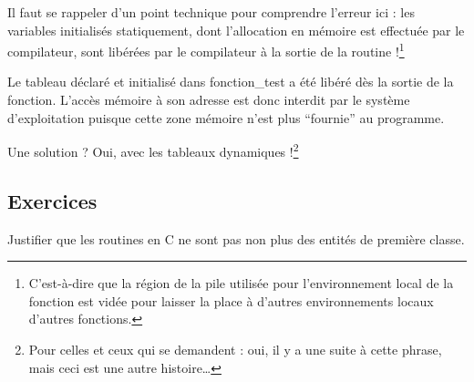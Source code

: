 \documentclass[../../../main.tex]{subfiles}
\begin{document}
Il faut se rappeler d'un point technique pour comprendre l'erreur ici : les variables initialisés statiquement, dont l'allocation en mémoire est effectuée par le compilateur, sont libérées par le compilateur à la sortie de la routine !\footnote{C'est-à-dire que la région de la pile utilisée pour l'environnement local de la fonction est vidée pour laisser la place à d'autres environnements locaux d'autres fonctions.}
 
Le tableau déclaré et initialisé dans \textsf{fonction\_test} a été libéré dès la sortie de la fonction. L'accès mémoire à son adresse est donc interdit par le système d'exploitation puisque cette zone mémoire n'est plus ``fournie'' au programme.
 
Une solution ? Oui, avec les tableaux dynamiques !\footnote{Pour celles et ceux qui se demandent : oui, il y a une suite à cette phrase, mais ceci est une autre histoire\dots}
\subsection{Exercices}
 Justifier que les routines en C ne sont pas non plus des entités de première classe.
\end{document}
